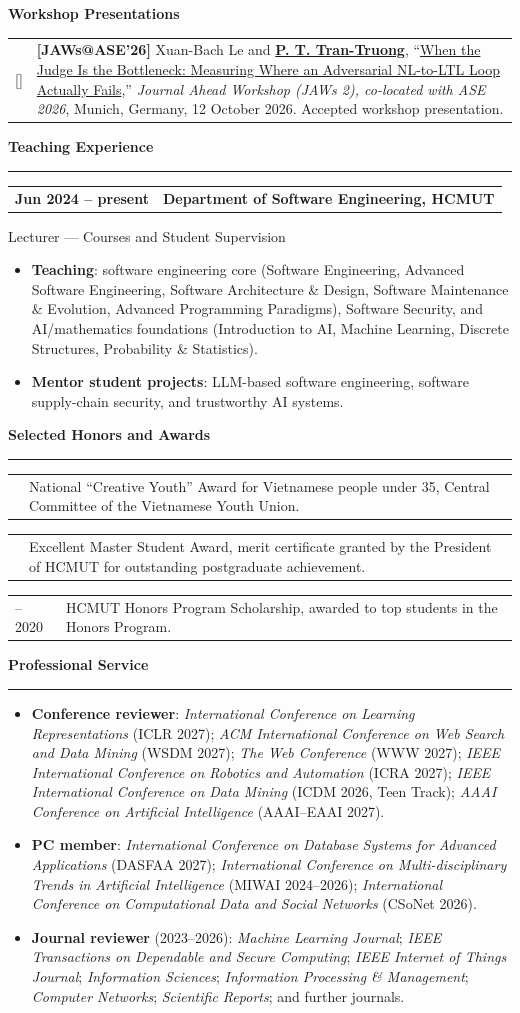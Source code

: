 \documentclass[11pt,a4paper]{article}
\makeatletter
\newcommand{\sectiontitle}[1]{%
  \Needspace{5\baselineskip}
  \vspace{0.28cm}%
  {\Large\bfseries #1}\par\vspace{0.08cm}\hrule\vspace{0.18cm}%
}
\newcommand{\headerline}[2]{%
  \noindent\begin{tabular*}{\textwidth}{@{}l@{\extracolsep{\fill}}r@{}}
  #1 & #2
  \end{tabular*}\par
}
\newcommand{\entry}[4]{%
  \vspace{0.16cm}
  \headerline{\textbf{#1}}{\textbf{#2}}
  {#3}\par
  #4
}
\newcounter{pubcounter}
\newcommand{\pubentry}[2]{%
  \stepcounter{pubcounter}%
  \vspace{0.045cm}
  \noindent\small\linespread{0.97}\selectfont\begin{tabularx}{\textwidth}{@{}p{0.78cm}@{}X@{}}
  [\thepubcounter] & #2
  \end{tabularx}
  \normalsize
}
\newcommand{\groupheading}[1]{%
  \Needspace{5\baselineskip}
  \vspace{0.08cm}\par{\small\bfseries #1}\par\vspace{0.01cm}\nopagebreak[4]%
}
\newcommand{\awardentry}[2]{%
  \vspace{0.06cm}
  \noindent\begin{tabularx}{\textwidth}{@{}p{2.75cm}X@{}}
  \textbullet\quad #1 & #2
  \end{tabularx}
}
\newcommand{\me}{\underline{\textbf{P. T. Tran-Truong}}}
\makeatother
\begin{document}
\groupheading{Workshop Presentations}
\pubentry{2026}{\textbf{[JAWs@ASE'26]} Xuan-Bach Le and \me, ``\href{https://conf.researchr.org/home/ase-2026/jaws-2-2026}{When the Judge Is the Bottleneck: Measuring Where an Adversarial NL-to-LTL Loop Actually Fails},'' \textit{Journal Ahead Workshop (JAWs 2), co-located with ASE 2026}, Munich, Germany, 12 October 2026. Accepted workshop presentation.}

\sectiontitle{Teaching Experience}
\entry{Jun 2024 -- present}{Department of Software Engineering, HCMUT}
{Lecturer --- Courses and Student Supervision}
{\begin{itemize}
    \item \textbf{Teaching}: software engineering core (Software Engineering, Advanced Software Engineering, Software Architecture \& Design, Software Maintenance \& Evolution, Advanced Programming Paradigms), Software Security, and AI/mathematics foundations (Introduction to AI, Machine Learning, Discrete Structures, Probability \& Statistics).
  \item \textbf{Mentor student projects}: LLM-based software engineering, software supply-chain security, and trustworthy AI systems.
\end{itemize}}

\sectiontitle{Selected Honors and Awards}
\awardentry{2025}{National ``Creative Youth'' Award for Vietnamese people under 35, Central Committee of the Vietnamese Youth Union.}
\awardentry{2023}{Excellent Master Student Award, merit certificate granted by the President of HCMUT for outstanding postgraduate achievement.}
\awardentry{2017 -- 2020}{HCMUT Honors Program Scholarship, awarded to top students in the Honors Program.}

\sectiontitle{Professional Service}
\begin{itemize}
    \item \textbf{Conference reviewer}: \textit{International Conference on Learning Representations} (ICLR 2027); \textit{ACM International Conference on Web Search and Data Mining} (WSDM 2027); \textit{The Web Conference} (WWW 2027); \textit{IEEE International Conference on Robotics and Automation} (ICRA 2027); \textit{IEEE International Conference on Data Mining} (ICDM 2026, Teen Track); \textit{AAAI Conference on Artificial Intelligence} (AAAI--EAAI 2027).
    \item \textbf{PC member}: \textit{International Conference on Database Systems for Advanced Applications} (DASFAA 2027); \textit{International Conference on Multi-disciplinary Trends in Artificial Intelligence} (MIWAI 2024--2026); \textit{International Conference on Computational Data and Social Networks} (CSoNet 2026).
    \item \textbf{Journal reviewer} (2023--2026): \textit{Machine Learning Journal}; \textit{IEEE Transactions on Dependable and Secure Computing}; \textit{IEEE Internet of Things Journal}; \textit{Information Sciences}; \textit{Information Processing \& Management}; \textit{Computer Networks}; \textit{Scientific Reports}; and further journals.
\end{itemize}
\end{document}

